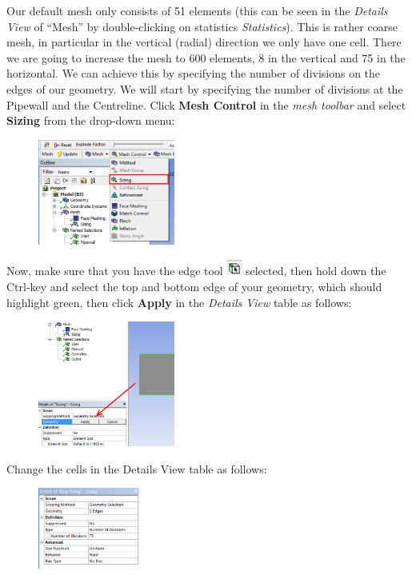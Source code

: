 \documentclass[11pt,a4paper,oneside,hidelinks]{scrartcl}
\newcommand\bfr[1]{\textcolor[rgb]{1,0.00,0.00}{\textbf{\textsf{#1}}}}
\begin{document}
Our default mesh only consists of 51 elements (this can be seen in the \emph{Details View} of ``Mesh'' by double-clicking on statistics \emph{Statistics}). This is rather coarse mesh, in particular in the vertical (radial) direction we only have one cell. There we are going to increase the mesh to 600 elements, 8 in the vertical and 75 in the horizontal. We can achieve this by specifying the number of divisions on the edges of our geometry. We will start by specifying the number of divisions at the Pipewall and the Centreline. Click \bfr{Mesh Control} in the \emph{mesh toolbar} and select \bfr{Sizing} from the drop-down menu:
\begin{figure}[H]
\begin{center}
\includegraphics[width=0.4\textwidth,clip]{mesh_sizing.png}
\end{center}
\end{figure}
Now, make sure that you have the edge tool \includegraphics[width=0.5cm]{edge_tool.png} selected, then hold down the Ctrl-key and select the top and bottom edge of your geometry, which should highlight green, then click \bfr{Apply} in the \emph{Details View} table as follows:
\begin{figure}[H]
\begin{center}
\includegraphics[width=0.4\textwidth,clip]{apply_edge_sizing.png}
\end{center}
\end{figure}
Change the cells in the Details View table as follows:
\begin{figure}[H]
\begin{center}
\includegraphics[width=0.3\textwidth,clip]{Details_of_sizing.png}
\end{center}
\end{figure}
\end{document}
